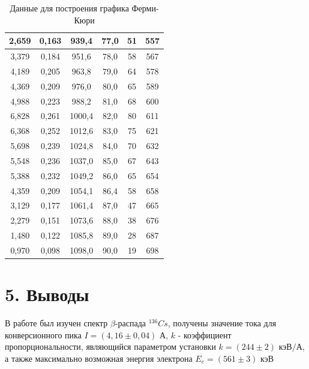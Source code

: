 \documentclass[a4paper,12pt]{report}
\begin{document}
\begin{table}[H]
\begin{tabular}{|c|c|c|c|c|c|}
2,659          & 0,163             & 939,4    & 77,0    & 51                                      & 557    \\ \hline
3,379          & 0,184             & 951,6    & 78,0    & 58                                      & 567    \\ \hline
4,189          & 0,205             & 963,8    & 79,0    & 64                                      & 578    \\ \hline
4,369          & 0,209             & 976,0    & 80,0    & 65                                      & 589    \\ \hline
4,988          & 0,223             & 988,2    & 81,0    & 68                                      & 600    \\ \hline
6,828          & 0,261             & 1000,4   & 82,0    & 80                                      & 611    \\ \hline
6,368          & 0,252             & 1012,6   & 83,0    & 75                                      & 621    \\ \hline
5,698          & 0,239             & 1024,8   & 84,0    & 70                                      & 632    \\ \hline
5,548          & 0,236             & 1037,0   & 85,0    & 67                                      & 643    \\ \hline
5,388          & 0,232             & 1049,2   & 86,0    & 65                                      & 654    \\ \hline
4,359          & 0,209             & 1054,1   & 86,4    & 58                                      & 658    \\ \hline
3,129          & 0,177             & 1061,4   & 87,0    & 47                                      & 665    \\ \hline
2,279          & 0,151             & 1073,6   & 88,0    & 38                                      & 676    \\ \hline
1,480          & 0,122             & 1085,8   & 89,0    & 28                                      & 687    \\ \hline
0,970          & 0,098             & 1098,0   & 90,0    & 19                                      & 698    \\ \hline
\end{tabular}
\caption{Данные для построения графика Ферми-Кюри}
\end{table}

\section*{5. Выводы}
В работе был изучен спектр $\beta$-распада $  ^{136} Cs $, получены значение тока для конверсионного пика $I = (4,16 \pm 0,04)$ А, $k$ - коэффициент пропорциональности, являющийся параметром установки $k= (244\pm 2) \text{ кэВ/А}$, а также максимально возможная энергия электрона $E_{e}  = (561\pm3) $ кэВ
\end{document}
